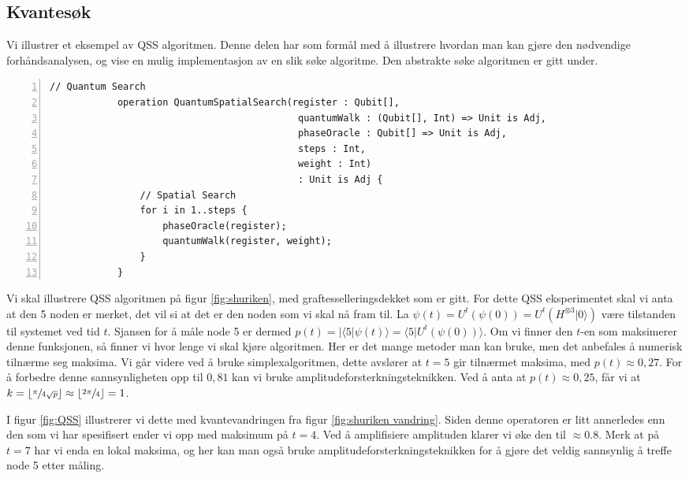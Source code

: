     \subsection{Kvantesøk}

        Vi illustrer et eksempel av QSS algoritmen. Denne delen har som formål med å illustrere hvordan man kan gjøre den nødvendige forhåndsanalysen, og vise en mulig implementasjon av en slik søke algoritme. Den abstrakte søke algoritmen er gitt under.

        \begin{Verbatim}[gobble=2, numbers=left, frame=lines,
            framesep=3mm,
            label={[Beginning of code]End of code}]
            // Quantum Search
            operation QuantumSpatialSearch(register : Qubit[],  
                                            quantumWalk : (Qubit[], Int) => Unit is Adj, 
                                            phaseOracle : Qubit[] => Unit is Adj, 
                                            steps : Int, 
                                            weight : Int) 
                                            : Unit is Adj {
                // Spatial Search
                for i in 1..steps {
                    phaseOracle(register);
                    quantumWalk(register, weight);
                }
            }
        \end{Verbatim}

        Vi skal illustrere QSS algoritmen på figur \ref{fig:shuriken}, med graftesselleringsdekket som er gitt. For dette QSS eksperimentet skal vi anta at den 5 noden er merket, det vil si at det er den noden som vi skal nå fram til. La $\psi(t) = U^t(\psi(0)) = U^t(H^{\otimes 3}|0\rangle)$ være tilstanden til systemet ved tid $t$. Sjansen for å måle node 5 er dermed $p(t) = |\langle 5|\psi(t)\rangle = \langle 5|U^t(\psi(0))\rangle$. Om vi finner den $t$-en som maksimerer denne funksjonen, så finner vi hvor lenge vi skal kjøre algoritmen. Her er det mange metoder man kan bruke, men det anbefales å numerisk tilnærme seg maksima. Vi går videre ved å bruke simplexalgoritmen, dette avslører at $t=5$ gir tilnærmet maksima, med $p(t) \approx 0,27$. For å forbedre denne sannsynligheten opp til $0,81$ kan vi bruke amplitudeforsterkningsteknikken. Ved å anta at $p(t) \approx 0,25$, får vi at $k = \lfloor \sfrac{\pi}{4\sqrt{p}}\rfloor \approx \lfloor\sfrac{2\pi}{4}\rfloor = 1$.

        I figur \ref{fig:QSS} illustrerer vi dette med kvantevandringen fra figur \ref{fig:shuriken vandring}. Siden denne operatoren er litt annerledes enn den som vi har spesifisert ender vi opp med maksimum på $t=4$. Ved å amplifisiere amplituden klarer vi øke den til $\approx 0.8$. Merk at på $t=7$ har vi enda en lokal maksima, og her kan man også bruke amplitudeforsterkningsteknikken for å gjøre det veldig sannsynlig å treffe node 5 etter måling.